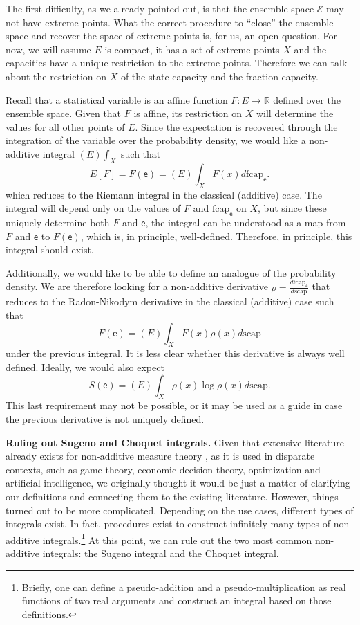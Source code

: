 \documentclass[10pt,twocolumn, nofootinbib]{revtex4-2}
\newcommand\capacity{\mathrm{scap}}
\newcommand\frcap{\mathrm{fcap}}
\newcommand{\ens}[1][e] {\mathsf{#1}} %
\newcommand{\Ens}[1][E] {\mathcal{#1}} %
\begin{document}
The first difficulty, as we already pointed out, is that the ensemble space $\Ens$ may not have extreme points. What the correct procedure to ``close'' the ensemble space and recover the space of extreme points is, for us, an open question. For now, we will assume $E$ is compact, it has a set of extreme points $X$ and the capacities have a unique restriction to the extreme points. Therefore we can talk about the restriction on $X$ of the state capacity and the fraction capacity.

Recall that a statistical variable is an affine function $F : E \to \mathbb{R}$ defined over the ensemble space. Given that $F$ is affine, its restriction on $X$ will determine the values for all other points of $E$. Since the expectation is recovered through the integration of the variable over the probability density, we would like a non-additive integral $(E)\int_X$ such that
\begin{equation}
	E[F] = F(\ens) = (E)\int_X F(x) d\frcap_{\ens}.
\end{equation}
which reduces to the Riemann integral in the classical (additive) case. The integral will depend only on the values of $F$ and $\frcap_{\ens}$ on $X$, but since these uniquely determine both $F$ and $\ens$, the integral can be understood as a map from $F$ and $\ens$ to $F(\ens)$, which is, in principle, well-defined. Therefore, in principle, this integral should exist.

Additionally, we would like to be able to define an analogue of the probability density. We are therefore looking for a non-additive derivative $\rho = \frac{d \frcap_{\ens}}{d \capacity}$ that reduces to the Radon-Nikodym derivative in the classical (additive) case such that
\begin{equation}
	F(\ens) = (E)\int_X F(x) \rho(x) d\capacity
\end{equation}
under the previous integral. It is less clear whether this derivative is always well defined. Ideally, we would also expect
\begin{equation}
	S(\ens) = (E)\int_X \rho(x) \log \rho(x) d\capacity.
\end{equation}
This last requirement may not be possible, or it may be used as a guide in case the previous derivative is not uniquely defined.

\textbf{Ruling out Sugeno and Choquet integrals.} Given that extensive literature already exists for non-additive measure theory \cite{denneberg1994non,grabisch2016}, as it is used in disparate contexts, such as game theory, economic decision theory, optimization and artificial intelligence, we originally thought it would be just a matter of clarifying our definitions and connecting them to the existing literature. However, things turned out to be more complicated. Depending on the use cases, different types of integrals exist. In fact, procedures exist\cite{nonadditive2014,pap2013} to construct infinitely many types of non-additive integrals.\footnote{Briefly, one can define a pseudo-addition and a pseudo-multiplication as real functions of two real arguments and construct an integral based on those definitions.} At this point, we can rule out the two most common non-additive integrals: the Sugeno integral and the Choquet integral.
\end{document}
